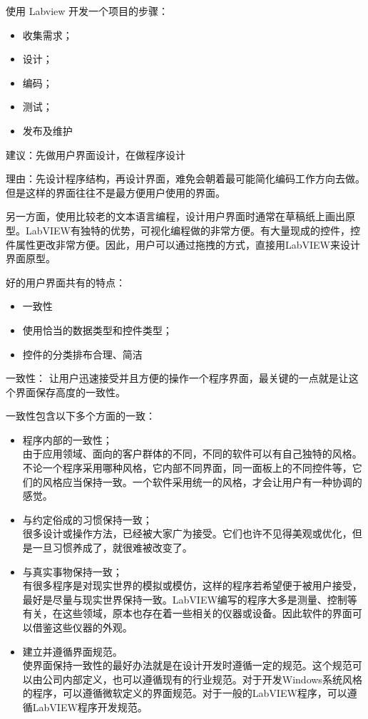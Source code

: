 使用 Labview 开发一个项目的步骤：
\begin{itemize}
\item 收集需求； 
\item 设计；
\item 编码；
\item 测试；
\item 发布及维护
\end{itemize}

建议：先做用户界面设计，在做程序设计

理由：先设计程序结构，再设计界面，难免会朝着最可能简化编码工作方向去做。但是这样的界面往往不是最方便用户使用的界面。

另一方面，使用比较老的文本语言编程，设计用户界面时通常在草稿纸上画出原型。LabVIEW有独特的优势，可视化编程做的非常方便。有大量现成的控件，控件属性更改非常方便。因此，用户可以通过拖拽的方式，直接用LabVIEW来设计界面原型。

好的用户界面共有的特点：
\begin{itemize}
\item 一致性
\item 使用恰当的数据类型和控件类型；
\item 控件的分类排布合理、简洁
\end{itemize}

一致性：
让用户迅速接受并且方便的操作一个程序界面，最关键的一点就是让这个界面保存高度的一致性。

一致性包含以下多个方面的一致：
\begin{itemize}
\item 程序内部的一致性；\\
由于应用领域、面向的客户群体的不同，不同的软件可以有自己独特的风格。不论一个程序采用哪种风格，它内部不同界面，同一面板上的不同控件等，它们的风格应当保持一致。一个软件采用统一的风格，才会让用户有一种协调的感觉。
\item 与约定俗成的习惯保持一致；\\
很多设计或操作方法，已经被大家广为接受。它们也许不见得美观或优化，但是一旦习惯养成了，就很难被改变了。
\item 与真实事物保持一致；\\
有很多程序是对现实世界的模拟或模仿，这样的程序若希望便于被用户接受，最好是尽量与现实世界保持一致。LabVIEW编写的程序大多是测量、控制等有关，在这些领域，原本也存在着一些相关的仪器或设备。因此软件的界面可以借鉴这些仪器的外观。
\item 建立并遵循界面规范。\\
使界面保持一致性的最好办法就是在设计开发时遵循一定的规范。这个规范可以由公司内部定义，也可以遵循现有的行业规范。对于开发Windows系统风格的程序，可以遵循微软定义的界面规范。对于一般的LabVIEW程序，可以遵循LabVIEW程序开发规范。
\end{itemize}

